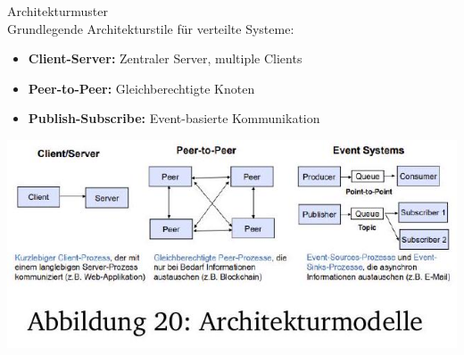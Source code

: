 \begin{concept}{Architekturmuster}\\
Grundlegende Architekturstile für verteilte Systeme:
\begin{itemize}
    \item \textbf{Client-Server:} Zentraler Server, multiple Clients
    \item \textbf{Peer-to-Peer:} Gleichberechtigte Knoten
    \item \textbf{Publish-Subscribe:} Event-basierte Kommunikation
\end{itemize}
\includegraphics[width=0.9\linewidth]{images/2024_12_29_0d1d7b5551ea1b4b41bdg-18}
\end{concept}


